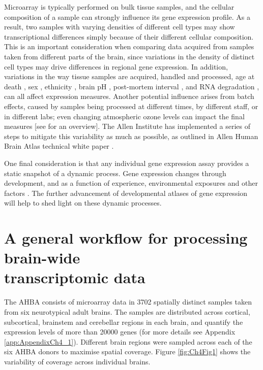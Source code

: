 Microarray is typically performed on bulk tissue samples, and the cellular composition of a sample can strongly influence its gene expression profile. As a result, two samples with varying densities of different cell types may show transcriptional differences simply because of their different cellular composition. This is an important consideration when comparing data acquired from samples taken from different parts of the brain, since variations in the density of distinct cell types may drive differences in regional gene expression. In addition, variations in the way tissue samples are acquired, handled and processed, age at death \citep{Glass2013}, sex \citep{Berchtold2008,Trabzuni2013}, ethnicity \citep{Spielman2007}, brain pH \citep{Mexal2006}, post-mortem interval \citep{Zhu2017}, and RNA degradation \citep{Jaksik2015}, can all affect expression measures. Another potential influence arises from batch effects, caused by samples being processed at different times, by different staff, or in different labs; even changing atmospheric ozone levels can impact the final measures \citep{Fare2003} [see \citet{Scherer2009} for an overview]. The Allen Institute has implemented a series of steps to mitigate this variability as much as possible, as outlined in Allen Human Brain Atlas technical white paper \citep{AHBAdoc}.

One final consideration is that any individual gene expression assay provides a static snapshot of a dynamic process. Gene expression changes through development, and as a function of experience, environmental exposures and other factors \citep{Fraser2005,Choi2007,Berchtold2008,Cole2009,Birdsill2011,Naumova2012,Kumar2013}.
The further advancement of developmental atlases of gene expression \citep{Johnson2009,Colantuoni2011,Kang2011,Fertuzinhos2014,Bakken2016} will help to shed light on these dynamic processes.

\section{A general workflow for processing brain-wide \\transcriptomic data}
The AHBA consists of microarray data in \num{3702} spatially distinct samples taken from six neurotypical adult brains. The samples are distributed across cortical, subcortical, brainstem and cerebellar regions in each brain, and quantify the expression levels of more than \num{20000} genes (for more details see Appendix \ref{app:AppendixCh4_1}). Different brain regions were sampled across each of the six AHBA donors to maximise spatial coverage. Figure \ref{fig:Ch4Fig1} shows the  variability of coverage across individual brains.

